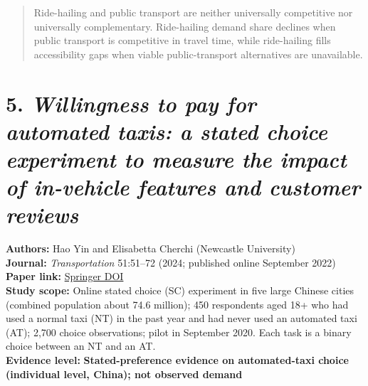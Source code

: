 \documentclass[10pt,a4paper]{article}
\begin{document}
\begin{quote}
Ride-hailing and public transport are neither universally competitive nor universally complementary. Ride-hailing demand share declines when public transport is competitive in travel time, while ride-hailing fills accessibility gaps when viable public-transport alternatives are unavailable.
\end{quote}




\hypertarget{willingness-to-pay-for-automated-taxis}{%
\section{\texorpdfstring{5. \emph{Willingness to pay for automated taxis: a stated choice experiment to measure the impact of in-vehicle features and customer reviews}}{5. Willingness to pay for automated taxis: a stated choice experiment to measure the impact of in-vehicle features and customer reviews}}\label{willingness-to-pay-for-automated-taxis}}

\textbf{Authors:} Hao Yin and Elisabetta Cherchi (Newcastle University)\\
\textbf{Journal:} \emph{Transportation} 51:51--72 (2024; published online September 2022)\\
\textbf{Paper link:} \href{https://doi.org/10.1007/s11116-022-10319-3}{Springer DOI}\\
\textbf{Study scope:} Online stated choice (SC) experiment in five large Chinese cities (combined population about 74.6 million); 450 respondents aged 18+ who had used a normal taxi (NT) in the past year and had never used an automated taxi (AT); 2,700 choice observations; pilot in September 2020. Each task is a binary choice between an NT and an AT.\\
\textbf{Evidence level:} \textbf{Stated-preference evidence on automated-taxi choice (individual level, China); not observed demand}
\end{document}
